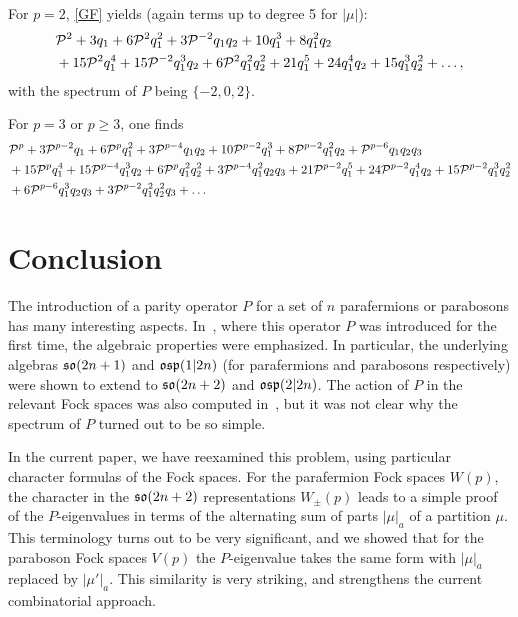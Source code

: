 \documentclass{SciPost}
\begin{document}
For $p=2$, \eqref{GF} yields (again terms up to degree 5 for $|\mu|$):
\begin{align*}
& {\cal P}^2+ 3q_1+ 6{\cal P}^2q_1^2+ 3{\cal P}^{-2}q_1q_2+ 10q_1^3+ 8q_1^2 q_2\\
&+ 15{\cal P}^2q_1^4+ 15{\cal P}^{-2}q_1^3q_2+ 6{\cal P}^2q_1^2q_2^2 + 21q_1^5+ 24q_1^4q_2+15q_1^3q_2^2+\ldots,
\end{align*}
with the spectrum of $P$ being $\{-2,0,2\}$.

For $p=3$ or $p\geq 3$, one finds
\begin{align*}
&{\cal P}^p+ 3 {\cal P}^{p-2} q_1+ 6 {\cal P}^p q_1^2+ 3 {\cal P}^{p-4}q_1 q_2 + 10 {\cal P}^{p-2} q_1^3+ 8 {\cal P}^{p-2} q_1^2 q_2+ {\cal P}^{p-6}q_1 q_2 q_3\\
 &+15 {\cal P}^p q_1^4+ 15{\cal P}^{p-4} q_1^3 q_2+ 6 {\cal P}^p q_1^2 q_2^2+ 3{\cal P}^{p-4} q_1^2 q_2 q_3+ 21 {\cal P}^{p-2} q_1^5+ 24 {\cal P}^{p-2} q_1^4 q_2+ 15 {\cal P}^{p-2} q_1^3 q_2^2\\
& + 6{\cal P}^{p-6} q_1^3 q_2 q_3+ 3 {\cal P}^{p-2} q_1^2 q_2^2 q_3+\ldots
\end{align*}

\setcounter{equation}{0}
\section{Conclusion}
\label{sec7}
The introduction of a parity operator $P$ for a set of $n$ parafermions or parabosons has many interesting aspects.
In~\cite{SV2026}, where this operator $P$ was introduced for the first time, the algebraic properties were emphasized.
In particular, the underlying algebras $\mathfrak{so}(2n+1)$ and $\mathfrak{osp}(1|2n)$ (for parafermions and parabosons respectively) were shown to extend to $\mathfrak{so}(2n+2)$ and $\mathfrak{osp}(2|2n)$.
The action of $P$ in the relevant Fock spaces was also computed in~\cite{SV2026}, but it was not clear why the spectrum of $P$ turned out to be so simple.

In the current paper, we have reexamined this problem, using particular character formulas of the Fock spaces. 
For the parafermion Fock spaces $W(p)$, the character in the $\mathfrak{so}(2n+2)$ representations $W_\pm(p)$ leads to a simple proof of the $P$-eigenvalues in terms of the alternating sum of parts $|\mu|_a$ of a partition $\mu$. 
This terminology turns out to be very significant, and we showed that for the paraboson Fock spaces $V(p)$ the $P$-eigenvalue takes the same form with $|\mu|_a$ replaced by $|\mu'|_a$.
This similarity is very striking, and strengthens the current combinatorial approach.
\end{document}
